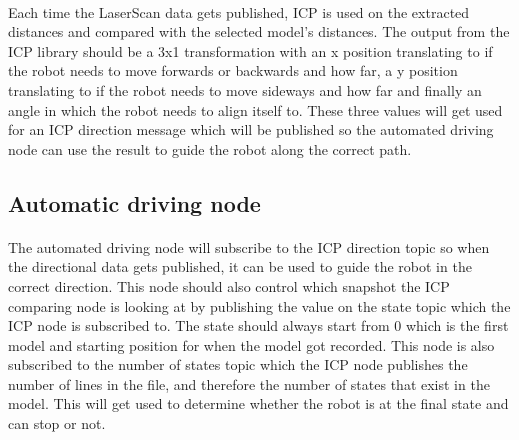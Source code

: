 \paragraph{}
Each time the LaserScan data gets published, ICP is used on the extracted distances and compared with the selected model's distances. The output from the ICP library should be a 3x1 transformation with an x position translating to if the robot needs to move forwards or backwards and how far, a y position translating to if the robot needs to move sideways and how far and finally an angle in which the robot needs to align itself to. These three values will get used for an ICP direction message which will be published so the automated driving node can use the result to guide the robot along the correct path.


\subsection{Automatic driving node}
\paragraph{}
The automated driving node will subscribe to the ICP direction topic so when the directional data gets published, it can be used to guide the robot in the correct direction. This node should also control which snapshot the ICP comparing node is looking at by publishing the value on the state topic which the ICP node is subscribed to. The state should always start from 0 which is the first model and starting position for when the model got recorded. This node is also subscribed to the number of states topic which the ICP node publishes the number of lines in the file, and therefore the number of states that exist in the model. This will get used to determine whether the robot is at the final state and can stop or not.

